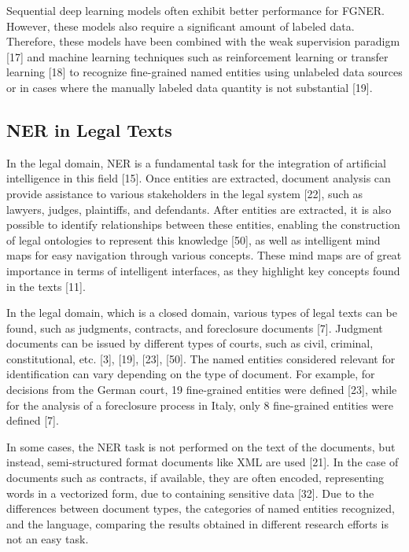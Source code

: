 Sequential deep learning models often exhibit better performance for FGNER. However, these models also require a significant amount of labeled data. Therefore, these models have been combined with the weak supervision paradigm [17] and machine learning techniques such as reinforcement learning or transfer learning [18] to recognize fine-grained named entities using unlabeled data sources or in cases where the manually labeled data quantity is not substantial [19].

\subsection{NER in Legal Texts}

In the legal domain, NER is a fundamental task for the integration of artificial intelligence in this field [15]. Once entities are extracted, document analysis can provide assistance to various stakeholders in the legal system [22], such as lawyers, judges, plaintiffs, and defendants. After entities are extracted, it is also possible to identify relationships between these entities, enabling the construction of legal ontologies to represent this knowledge [50], as well as intelligent mind maps for easy navigation through various concepts. These mind maps are of great importance in terms of intelligent interfaces, as they highlight key concepts found in the texts [11].

In the legal domain, which is a closed domain, various types of legal texts can be found, such as judgments, contracts, and foreclosure documents [7]. Judgment documents can be issued by different types of courts, such as civil, criminal, constitutional, etc. [3], [19], [23], [50]. The named entities considered relevant for identification can vary depending on the type of document. For example, for decisions from the German court, 19 fine-grained entities were defined [23], while for the analysis of a foreclosure process in Italy, only 8 fine-grained entities were defined [7].

In some cases, the NER task is not performed on the text of the documents, but instead, semi-structured format documents like XML are used [21]. In the case of documents such as contracts, if available, they are often encoded, representing words in a vectorized form, due to containing sensitive data [32]. Due to the differences between document types, the categories of named entities recognized, and the language, comparing the results obtained in different research efforts is not an easy task.

